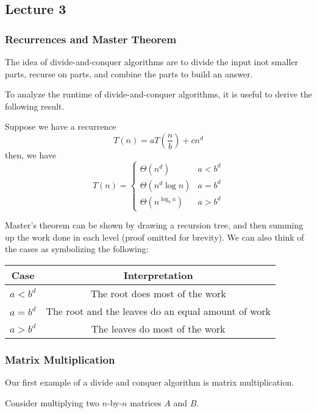 \subsection{Lecture 3}

\subsubsection{Recurrences and Master Theorem}
The idea of divide-and-conquer algorithms are to
divide the input inot smaller parts, recurse on parts,
and combine the parts to build an answer.

To analyze the runtime of divide-and-conquer algorithms, it is
useful to derive the following result.

\begin{theorem} 
    Suppose we have a recurrence
    \[ T(n) = a T(\frac{n}{b}) + cn^d \]
    then, we have
    \[ T(n) = \begin{cases}
        \Theta(n^d) & a < b^d \\
        \Theta(n^d \log n) & a = b^d \\
        \Theta(n^{\log_b a}) & a > b^d
    \end{cases} \]
\end{theorem}

Master's theorem can be shown by drawing a recursion tree,
and then summing up the work done in each level (proof omitted for brevity).
We can also think of the cases as symbolizing the following:

\begin{center}
\begin{tabular}{ c|c }
    Case & Interpretation \\ \hline
    $a < b^d$ & The root does most of the work \\ \hline
    $a = b^d$ & The root and the leaves do an equal amount of work \\ \hline
    $a > b^d$ & The leaves do most of the work \\ \hline
\end{tabular}
\end{center}

\subsubsection{Matrix Multiplication}
Our first example of a divide and conquer algorithm is matrix multiplication.

Consider multiplying two $n$-by-$n$ matrices $A$ and $B$.

